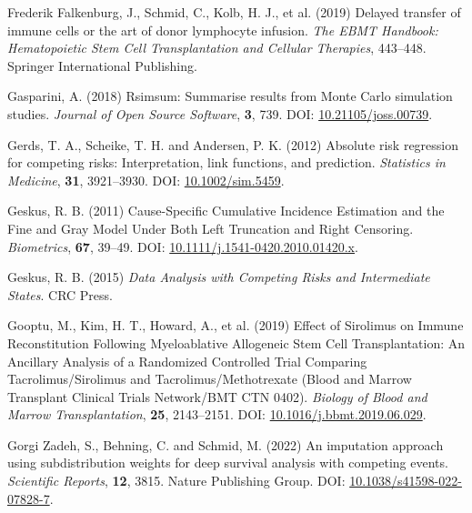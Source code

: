\documentclass[
  letterpaper,
  DIV=11,
  numbers=noendperiod]{scrreprt}
\newlength{\cslhangindent}
\newlength{\cslentryspacingunit} %
\newenvironment{CSLReferences}[2] %
 {%
  \setlength{\parindent}{0pt}
  \ifodd #1
  \let\oldpar\par
  \def\par{\hangindent=\cslhangindent\oldpar}
  \fi
  \setlength{\parskip}{#2\cslentryspacingunit}
 }%
 {}
\begin{document}
\begin{CSLReferences}{1}{0}
\leavevmode{}%
Frederik Falkenburg, J., Schmid, C., Kolb, H. J., et al. (2019) Delayed
transfer of immune cells or the art of donor lymphocyte infusion.
\emph{The EBMT Handbook: Hematopoietic Stem Cell Transplantation and
Cellular Therapies}, 443--448. Springer International Publishing.

\leavevmode{}%
Gasparini, A. (2018) Rsimsum: {Summarise} results from {Monte Carlo}
simulation studies. \emph{Journal of Open Source Software}, \textbf{3},
739. DOI:
\href{https://doi.org/10.21105/joss.00739}{10.21105/joss.00739}.

\leavevmode{}%
Gerds, T. A., Scheike, T. H. and Andersen, P. K. (2012) Absolute risk
regression for competing risks: Interpretation, link functions, and
prediction. \emph{Statistics in Medicine}, \textbf{31}, 3921--3930. DOI:
\href{https://doi.org/10.1002/sim.5459}{10.1002/sim.5459}.

\leavevmode{}%
Geskus, R. B. (2011) Cause-{Specific Cumulative Incidence Estimation}
and the {Fine} and {Gray Model Under Both Left Truncation} and {Right
Censoring}. \emph{Biometrics}, \textbf{67}, 39--49. DOI:
\href{https://doi.org/10.1111/j.1541-0420.2010.01420.x}{10.1111/j.1541-0420.2010.01420.x}.

\leavevmode{}%
Geskus, R. B. (2015) \emph{Data Analysis with Competing Risks and
Intermediate States}. CRC Press.

\leavevmode{}%
Gooptu, M., Kim, H. T., Howard, A., et al. (2019) Effect of {Sirolimus}
on {Immune Reconstitution Following Myeloablative Allogeneic Stem Cell
Transplantation}: {An Ancillary Analysis} of a {Randomized Controlled
Trial Comparing Tacrolimus}/{Sirolimus} and {Tacrolimus}/{Methotrexate}
({Blood} and {Marrow Transplant Clinical Trials Network}/{BMT CTN}
0402). \emph{Biology of Blood and Marrow Transplantation}, \textbf{25},
2143--2151. DOI:
\href{https://doi.org/10.1016/j.bbmt.2019.06.029}{10.1016/j.bbmt.2019.06.029}.

\leavevmode{}%
Gorgi Zadeh, S., Behning, C. and Schmid, M. (2022) An imputation
approach using subdistribution weights for deep survival analysis with
competing events. \emph{Scientific Reports}, \textbf{12}, 3815. Nature
Publishing Group. DOI:
\href{https://doi.org/10.1038/s41598-022-07828-7}{10.1038/s41598-022-07828-7}.


\end{CSLReferences}
\end{document}

